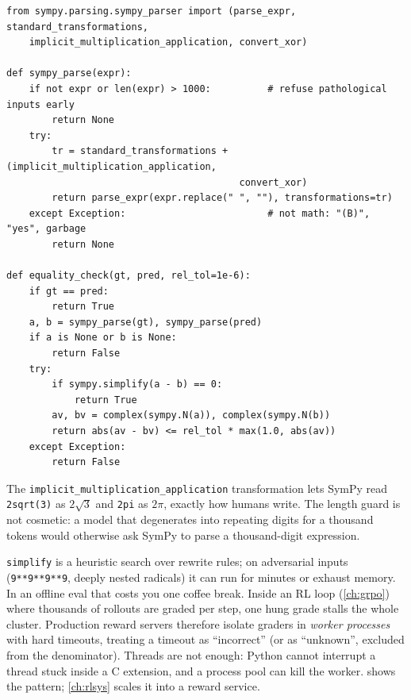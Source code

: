 \begin{lstlisting}[caption={Parsing with SymPy and the equality check.},label={lst:eval:sympy}]
from sympy.parsing.sympy_parser import (parse_expr, standard_transformations,
    implicit_multiplication_application, convert_xor)

def sympy_parse(expr):
    if not expr or len(expr) > 1000:          # refuse pathological inputs early
        return None
    try:
        tr = standard_transformations + (implicit_multiplication_application,
                                         convert_xor)
        return parse_expr(expr.replace(" ", ""), transformations=tr)
    except Exception:                         # not math: "(B)", "yes", garbage
        return None

def equality_check(gt, pred, rel_tol=1e-6):
    if gt == pred:
        return True
    a, b = sympy_parse(gt), sympy_parse(pred)
    if a is None or b is None:
        return False
    try:
        if sympy.simplify(a - b) == 0:
            return True
        av, bv = complex(sympy.N(a)), complex(sympy.N(b))
        return abs(av - bv) <= rel_tol * max(1.0, abs(av))
    except Exception:
        return False
\end{lstlisting}

The \texttt{implicit\_multiplication\_application} transformation lets SymPy read
\texttt{2sqrt(3)} as $2\sqrt{3}$ and \texttt{2pi} as $2\pi$, exactly how humans write. The length
guard is not cosmetic: a model that degenerates into repeating digits for a thousand tokens would
otherwise ask SymPy to parse a thousand-digit expression.

\begin{systemslens}
\texttt{simplify} is a heuristic search over rewrite rules; on adversarial inputs
(\texttt{9**9**9**9}, deeply nested radicals) it can run for minutes or exhaust memory. In an
offline eval that costs you one coffee break. Inside an RL loop (\cref{ch:grpo}) where thousands of
rollouts are graded per step, one hung grade stalls the whole cluster. Production reward servers
therefore isolate graders in \emph{worker processes} with hard timeouts, treating a timeout as
``incorrect'' (or as ``unknown'', excluded from the denominator). Threads are not enough: Python
cannot interrupt a thread stuck inside a C extension, and a process pool can kill the worker.
 shows the pattern; \cref{ch:rlsys} scales it into a reward service.
\end{systemslens}

